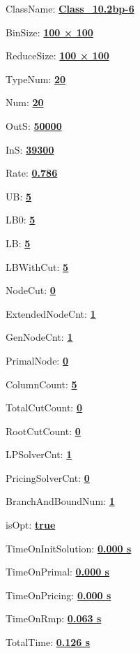 \documentclass[11pt]{article}
\begin{document}
\pagestyle{empty}


ClassName: \underline{\textbf{Class_10.2bp-6}}
\par
BinSize: \underline{\textbf{100 × 100}}
\par
ReduceSize: \underline{\textbf{100 × 100}}
\par
TypeNum: \underline{\textbf{20}}
\par
Num: \underline{\textbf{20}}
\par
OutS: \underline{\textbf{50000}}
\par
InS: \underline{\textbf{39300}}
\par
Rate: \underline{\textbf{0.786}}
\par
UB: \underline{\textbf{5}}
\par
LB0: \underline{\textbf{5}}
\par
LB: \underline{\textbf{5}}
\par
LBWithCut: \underline{\textbf{5}}
\par
NodeCut: \underline{\textbf{0}}
\par
ExtendedNodeCnt: \underline{\textbf{1}}
\par
GenNodeCnt: \underline{\textbf{1}}
\par
PrimalNode: \underline{\textbf{0}}
\par
ColumnCount: \underline{\textbf{5}}
\par
TotalCutCount: \underline{\textbf{0}}
\par
RootCutCount: \underline{\textbf{0}}
\par
LPSolverCnt: \underline{\textbf{1}}
\par
PricingSolverCnt: \underline{\textbf{0}}
\par
BranchAndBoundNum: \underline{\textbf{1}}
\par
isOpt: \underline{\textbf{true}}
\par
TimeOnInitSolution: \underline{\textbf{0.000 s}}
\par
TimeOnPrimal: \underline{\textbf{0.000 s}}
\par
TimeOnPricing: \underline{\textbf{0.000 s}}
\par
TimeOnRmp: \underline{\textbf{0.063 s}}
\par
TotalTime: \underline{\textbf{0.126 s}}
\par
\newpage


\end{document}
